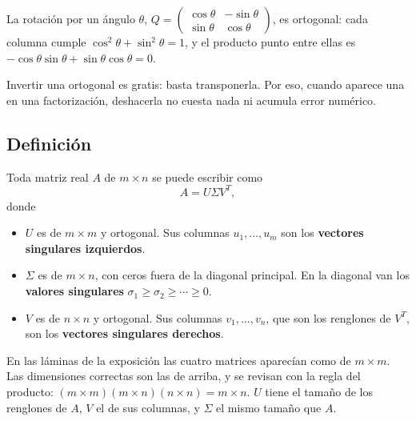 \documentclass[11pt,letterpaper]{article}
\begin{document}
\begin{ejemplo}
    La rotación por un ángulo $\theta$,
    $Q = \begin{pmatrix} \cos\theta & -\sin\theta \\ \sin\theta &
    \cos\theta \end{pmatrix}$, es ortogonal: cada columna cumple
    $\cos^2\theta + \sin^2\theta = 1$, y el producto punto entre ellas
    es $-\cos\theta\sin\theta + \sin\theta\cos\theta = 0$.
\end{ejemplo}

\begin{idea}
    Invertir una ortogonal es gratis: basta transponerla. Por eso,
    cuando aparece una en una factorización, deshacerla no cuesta
    nada ni acumula error numérico.
\end{idea}


\subsection*{Definición}

\begin{definicion}
    Toda matriz real $A$ de $m \times n$ se puede escribir como
    \[
        A = U \Sigma V^{T} ,
    \]
    donde
    \begin{itemize}[itemsep=0.2em]
        \item $U$ es de $m \times m$ y ortogonal. Sus columnas
              $u_1, \ldots, u_m$ son los \textbf{vectores singulares
              izquierdos}.
        \item $\Sigma$ es de $m \times n$, con ceros fuera de la
              diagonal principal. En la diagonal van los
              \textbf{valores singulares}
              $\sigma_1 \geq \sigma_2 \geq \cdots \geq 0$.
        \item $V$ es de $n \times n$ y ortogonal. Sus columnas
              $v_1, \ldots, v_n$, que son los renglones de $V^{T}$,
              son los \textbf{vectores singulares derechos}.
    \end{itemize}
\end{definicion}

\begin{ojo}
    En las láminas de la exposición las cuatro matrices aparecían
    como de $m \times m$. Las dimensiones correctas son las de
    arriba, y se revisan con la regla del producto: $(m \times m)
    (m \times n)(n \times n) = m \times n$. $U$ tiene el tamaño de los
    renglones de $A$, $V$ el de sus columnas, y $\Sigma$ el mismo
    tamaño que $A$.
\end{ojo}
\end{document}
